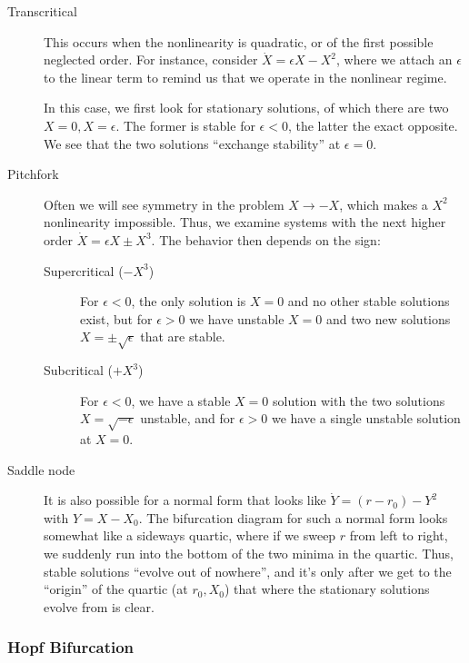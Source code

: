 \documentclass[10pt]{article}
\begin{document}
\begin{description}
    \item[Transcritical] This occurs when the nonlinearity is quadratic, or of
        the first possible neglected order. For instance, consider
        $\dot{X} = \epsilon X - X^2$, where we attach an $\epsilon$ to the
        linear term to remind us that we operate in the nonlinear regime.

        In this case, we first look for stationary solutions, of which there are
        two $X=0, X=\epsilon$. The former is stable for $\epsilon < 0$, the
        latter the exact opposite. We see that the two solutions ``exchange
        stability'' at $\epsilon = 0$.

    \item[Pitchfork] Often we will see symmetry in the problem $X \to -X$, which
        makes a $X^2$ nonlinearity impossible. Thus, we examine systems with the
        next higher order
        $\dot{X} = \epsilon X \pm X^3$.
        The behavior then depends on the sign:
        \begin{description}
            \item[Supercritical ($-X^3$)] For $\epsilon < 0$, the only solution
                is $X = 0$ and no other stable solutions exist, but for
                $\epsilon > 0$ we have unstable $X=0$ and two new solutions $X =
                \pm \sqrt{\epsilon}$ that are stable.
            \item[Subcritical ($+X^3$)] For $\epsilon < 0$, we have a stable
                $X=0$ solution with the two solutions $X = \sqrt{-\epsilon}$
                unstable, and for $\epsilon > 0$ we have a single unstable
                solution at $X=0$.
        \end{description}

    \item[Saddle node] It is also possible for a normal form that looks like
        $\dot{Y} = (r - r_0) - Y^2$
        with $Y = X - X_0$. The bifurcation diagram for such a normal form looks
        somewhat like a sideways quartic, where if we sweep $r$ from left to
        right, we suddenly run into the bottom of the two minima in the quartic.
        Thus, stable solutions ``evolve out of nowhere'', and it's only after we
        get to the ``origin'' of the quartic (at $r_0, X_0$) that where the
        stationary solutions evolve from is clear.
\end{description}

\subsubsection{Hopf Bifurcation}
\end{document}
